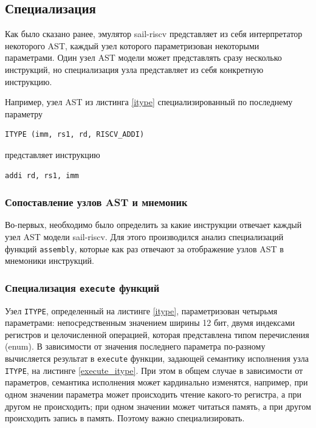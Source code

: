 \subsection{Специализация}

Как было сказано ранее, эмулятор sail-riscv представляет из себя интерпретатор некоторого AST, каждый узел которого параметризован некоторыми параметрами.
Один узел AST модели может представлять сразу несколько инструкций, но специализация узла представляет из себя конкретную инструкцию.

Например, узел AST из листинга \ref{itype} специализированный по последнему параметру
\begin{lstlisting}[caption={}, language={}]
  ITYPE (imm, rs1, rd, RISCV_ADDI)
\end{lstlisting}
представляет инструкцию
\begin{lstlisting}[caption={}, language={}]
  addi rd, rs1, imm
\end{lstlisting}

\subsubsection{Сопоставление узлов AST и мнемоник}

Во-первых, необходимо было определить за какие инструкции отвечает каждый узел AST модели sail-riscv.
Для этого производился анализ специализаций функций \texttt{assembly}, которые как раз отвечают за отображение узлов AST в мнемоники инструкций.

\subsubsection{Специализация \texttt{execute} функций}

Узел \texttt{ITYPE}, определенный на листинге \ref{itype}, параметризован четырьмя параметрами: непосредственным значением ширины 12 бит, двумя индексами регистров и целочисленной операцией, которая представлена типом перечисления (enum). В зависимости от значения последнего параметра по-разному вычисляется результат в \texttt{execute} функции, задающей семантику исполнения узла \texttt{ITYPE}, на листинге \ref{execute_itype}.
При этом в общем случае в зависимости от параметров, семантика исполнения может кардинально изменятся, например, при одном значении параметра может происходить чтение какого-то регистра, а при другом не происходить; при одном значении может читаться память, а при другом происходить запись в память. Поэтому важно специализировать.

